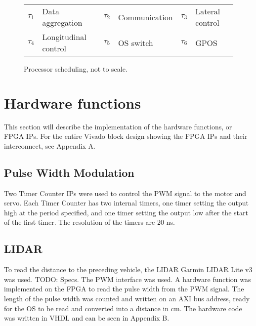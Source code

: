 \begin{figure}[H]
\centering
\begin{RTGrid}[nonumbers=1]{6}{25}








\end{RTGrid}
\caption{Processor scheduling, not to scale.}\label{fig:rtsched}
\begin{tabular}{r@{: }l r@{: }l r@{: }l}
$\tau_1$ & Data aggregation & $\tau_2$ & Communication & $\tau_3$ & Lateral control\\
$\tau_4$ & Longitudinal control & $\tau_5$ & OS switch & $\tau_6$ & GPOS
\end{tabular}
\end{figure}

\section{Hardware functions}
This section will describe the implementation of the hardware functions, or FPGA IPs. For the entire Vivado block design showing the FPGA IPs and their interconnect, see Appendix A.

\subsection{Pulse Width Modulation}
Two Timer Counter IPs were used to control the PWM signal to the motor and servo. Each Timer Counter has two internal timers, one timer setting the output high at the period specified, and one timer setting the output low after the start of the first timer. The resolution of the timers are 20 ns.

\subsection{LIDAR}
To read the distance to the preceding vehicle, the LIDAR Garmin LIDAR Lite v3 was used. TODO: Specs. The PWM interface was used. A hardware function was implemented on the FPGA to read the pulse width from the PWM signal. The length of the pulse width was counted and written on an AXI bus address, ready for the OS to be read and converted into a distance in cm. The hardware code was written in VHDL and can be seen in Appendix B.

